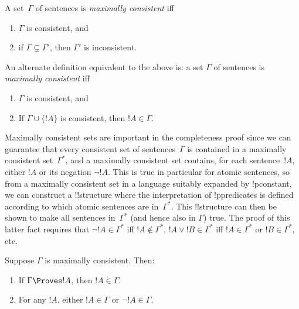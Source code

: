 \documentclass[../../include/open-logic-section]{subfiles}
\begin{document}

\begin{defn}
A set~$\Gamma$ of sentences is \emph{maximally consistent} iff
\begin{enumerate}
\item $\Gamma$ is consistent, and
\item if $\Gamma \subsetneq \Gamma'$, then $\Gamma'$ is inconsistent.
\end{enumerate}
\end{defn}

\begin{digress}
An alternate definition equivalent to the above is: a set $\Gamma$ of
sentences is \emph{maximally consistent} iff
\begin{enumerate}
\item $\Gamma$ is consistent, and
\item If $\Gamma \cup \{ !A \}$ is consistent, then $!A \in \Gamma$.
\end{enumerate}
\end{digress}

\begin{explain}
Maximally consistent sets are important in the completeness proof
since we can guarantee that every consistent set of sentences~$\Gamma$
is contained in a maximally consistent set~$\Gamma^*$, and a maximally
consistent set contains, for each sentence~$!A$, either $!A$ or its
negation $\lnot !A$.  This is true in particular for atomic sentences,
so from a maximally consistent set in a language suitably expanded by
!p{constant}, we can construct a !!{structure} where the
interpretation of !p{predicates} is defined according to which atomic
sentences are in~$\Gamma^*$. This !!{structure} can then be shown to
make all sentences in~$\Gamma^*$ (and hence also in $\Gamma$)
true. The proof of this latter fact requires that $\lnot !A \in
\Gamma^*$ iff $!A \notin \Gamma^*$, $!A \lor !B \in \Gamma^*$ iff $!A
\in \Gamma^*$ or $!B \in \Gamma^*$, etc.
\end{explain}

\begin{prop}
Suppose $\Gamma$ is maximally consistent. Then:
\begin{enumerate}
\item {} If $\Gamma \Proves !A$, then $!A \in
  \Gamma$.

\item {} For any $!A$, either $!A \in
  \Gamma$ or $\lnot !A \in \Gamma$.



\end{enumerate}
\end{prop}
\end{document}
